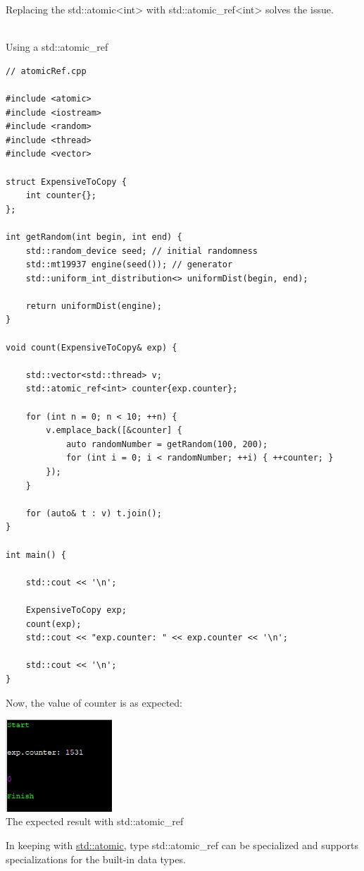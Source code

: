 Replacing the std::atomic<int> with std::atomic\_ref<int> solves the issue.

\hspace*{\fill} \\ %
\noindent
Using a std::atomic\_ref
\begin{lstlisting}[style=styleCXX]
// atomicRef.cpp

#include <atomic>
#include <iostream>
#include <random>
#include <thread>
#include <vector>

struct ExpensiveToCopy {
	int counter{};
};

int getRandom(int begin, int end) {
	std::random_device seed; // initial randomness
	std::mt19937 engine(seed()); // generator
	std::uniform_int_distribution<> uniformDist(begin, end);
	
	return uniformDist(engine);
}

void count(ExpensiveToCopy& exp) {
	
	std::vector<std::thread> v;
	std::atomic_ref<int> counter{exp.counter};
	
	for (int n = 0; n < 10; ++n) {
		v.emplace_back([&counter] {
			auto randomNumber = getRandom(100, 200);
			for (int i = 0; i < randomNumber; ++i) { ++counter; }
		});
	}

	for (auto& t : v) t.join();
}

int main() {
	
	std::cout << '\n';
	
	ExpensiveToCopy exp;
	count(exp);
	std::cout << "exp.counter: " << exp.counter << '\n';
	
	std::cout << '\n';
}
\end{lstlisting}

Now, the value of counter is as expected:

\begin{center}
\includegraphics[width=0.3\textwidth]{content/3/chapter6/images/10.png}\\
The expected result with std::atomic\_ref
\end{center}

In keeping with \href{https://en.cppreference.com/w/cpp/atomic/atomic}{std::atomic}, type std::atomic\_ref can be specialized and supports specializations for the built-in data types.

